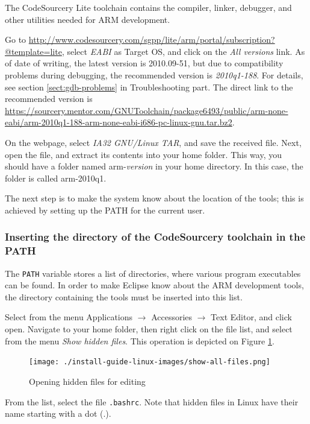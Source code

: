\documentclass[a4paper, 10pt]{article}
\begin{document}
The CodeSourcery Lite toolchain contains
the compiler, linker, debugger, and other utilities needed for
ARM development.

Go to
\url{http://www.codesourcery.com/sgpp/lite/arm/portal/subscription?@template=lite},
select \emph{EABI} as Target OS, and click on the
\emph{All versions} link.
As of date of writing, the latest version is 2010.09-51, but
due to compatibility problems during debugging, the recommended version is \emph{2010q1-188}.
For details, see section \ref{sect:gdb-problems} in Troubleshooting part.
The direct link to the recommended version is
\url{https://sourcery.mentor.com/GNUToolchain/package6493/public/arm-none-eabi/arm-2010q1-188-arm-none-eabi-i686-pc-linux-gnu.tar.bz2}.

On the webpage, select \emph{IA32 GNU/Linux TAR},
and save the received file.
Next, open the file, and extract its contents into your home folder.
This way, you should have a folder named arm-\textit{version} in your home directory.
In this case, the folder is called arm-2010q1.

The next step is to make the system know about the location of the tools;
this is achieved by setting up the PATH for the current user.

\subsubsection{Inserting the directory of the CodeSourcery toolchain in the PATH}

    \label{sect:change-path}
The \verb+PATH+ variable stores a list of directories, where various
program executables can be found. In order to make Eclipse know about the
ARM development tools, the directory containing the tools must be inserted
into this list.

Select from the menu Applications $\rightarrow$ Accessories $\rightarrow$ Text Editor,
and click open. Navigate to your home folder, then right click on the file list,
and select from the menu \emph{Show hidden files}. This operation is depicted on Figure
\ref{fig:show-hidden-files}.

    \begin{figure}[H]
    \centering
        \texttt{[image: ./install-guide-linux-images/show-all-files.png]}
        \caption{Opening hidden files for editing}
        \label{fig:show-hidden-files}
    \end{figure}

From the list, select the file \verb+.bashrc+. Note that hidden files in Linux
have their name starting with a dot (.).
\end{document}
